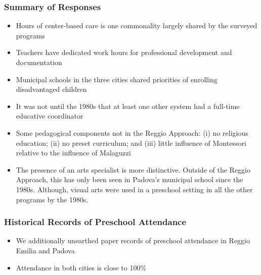 \documentclass[static]{JJH-Beamer_PAGENOS}
\begin{document}
\begin{frame}
\frametitle{Summary of Responses}
\footnotesize
\begin{itemize}
	\item Hours of center-based care is one commonality largely shared by the surveyed programs
	\item Teachers have dedicated work hours for professional development and documentation
	\item Municipal schools in the three cities shared priorities of enrolling disadvantaged children
	\item It was not until the 1980s that at least one other system had a full-time educative coordinator
	\item Some pedagogical components not in the Reggio Approach: (i) no religious education; (ii) no preset curriculum; and (iii) little influence of Montessori relative to the influence of Malaguzzi
	\item The presence of an arts specialist is more distinctive. Outside of the Reggio Approach, this has only been seen in Padova's municipal school since the 1980s. Although, visual arts were used in a preschool setting in all the other programs by the 1980s.  
\end{itemize}
\end{frame}

\begin{frame}
\frametitle{Historical Records of Preschool Attendance}
\begin{itemize}
	\item We additionally unearthed paper records of preschool attendance in Reggio Emilia and Padova
	\item Attendance in both cities is close to 100\% 
\end{itemize}
\end{frame}
\end{document}
